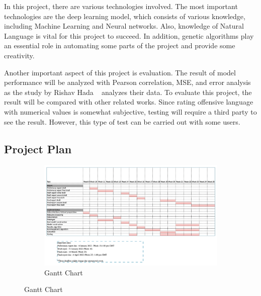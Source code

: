\documentclass[12pt, natbib=false]{article}
\begin{document}
In this project, there are various technologies involved.
The most important technologies are the deep learning model, which consists of various knowledge, including Machine Learning and Neural networks.
Also, knowledge of Natural Language is vital for this project to succeed.
In addition, genetic algorithms play an essential role in automating some parts of the project and provide some creativity.

Another important aspect of this project is evaluation.
The result of model performance will be analyzed with Pearson correlation, MSE, and error analysis as the study by Rishav Hada ~\cite{hada2021ruddit} analyzes their data.
To evaluate this project, the result will be compared with other related works.
Since rating offensive language with numerical values is somewhat subjective, testing will require a third party to see the result.
However, this type of test can be carried out with some users. 

\subsection{Project Plan}
\begin{figure}[h!]
  \centering
  \begin{subfigure}[b]{1.0\linewidth}
    \includegraphics[width=\linewidth]{./gantt.png}
    \caption{Gantt Chart}
  \end{subfigure}
  \label{ganttChart}
\end{figure}
\end{document}
